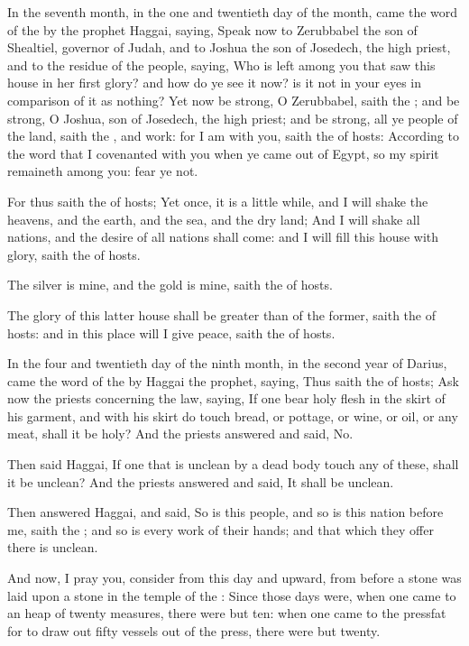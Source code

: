 \Chapter
\Verse In the seventh month, in the one and twentieth day of the month, came the word of the \LORD by the prophet Haggai, saying, \Verse Speak now to Zerubbabel the son of Shealtiel, governor of Judah, and to Joshua the son of Josedech, the high priest, and to the residue of the people, saying, \Verse Who is left among you that saw this house in her first glory? and how do ye see it now? is it not in your eyes in comparison of it as nothing?  \Verse Yet now be strong, O Zerubbabel, saith the \LORD; and be strong, O Joshua, son of Josedech, the high priest; and be strong, all ye people of the land, saith the \LORD, and work: for I am with you, saith the \LORD of hosts: \Verse According to the word that I covenanted with you when ye came out of Egypt, so my spirit remaineth among you: fear ye not.

\Verse For thus saith the \LORD of hosts; Yet once, it is a little while, and I will shake the heavens, and the earth, and the sea, and the dry land; \Verse And I will shake all nations, and the desire of all nations shall come: and I will fill this house with glory, saith the \LORD of hosts.

\Verse The silver is mine, and the gold is mine, saith the \LORD of hosts.

\Verse The glory of this latter house shall be greater than of the former, saith the \LORD of hosts: and in this place will I give peace, saith the \LORD of hosts.

\Verse In the four and twentieth day of the ninth month, in the second year of Darius, came the word of the \LORD by Haggai the prophet, saying, \Verse Thus saith the \LORD of hosts; Ask now the priests concerning the law, saying, \Verse If one bear holy flesh in the skirt of his garment, and with his skirt do touch bread, or pottage, or wine, or oil, or any meat, shall it be holy? And the priests answered and said, No.

\Verse Then said Haggai, If one that is unclean by a dead body touch any of these, shall it be unclean? And the priests answered and said, It shall be unclean.

\Verse Then answered Haggai, and said, So is this people, and so is this nation before me, saith the \LORD; and so is every work of their hands; and that which they offer there is unclean.

\Verse And now, I pray you, consider from this day and upward, from before a stone was laid upon a stone in the temple of the \LORD: \Verse Since those days were, when one came to an heap of twenty measures, there were but ten: when one came to the pressfat for to draw out fifty vessels out of the press, there were but twenty.

